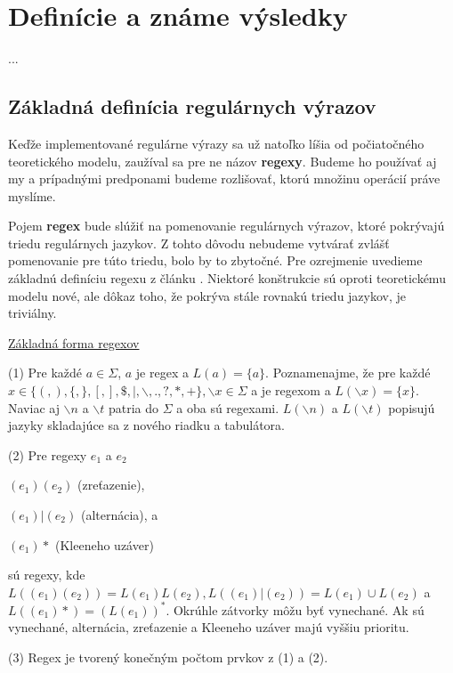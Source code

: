 \chapter{Definície a známe výsledky}
\label{chap:kapitola1}
...

\section{Základná definícia regulárnych výrazov}
\label{def}

Keďže implementované regulárne výrazy sa už natoľko líšia od počiatočného teoretického modelu, zaužíval sa pre ne názov \textbf{regexy}. Budeme ho používať aj my a prípadnými predponami budeme rozlišovať, ktorú množinu operácií práve myslíme.

Pojem \textbf{regex} bude slúžiť na pomenovanie regulárnych výrazov, ktoré pokrývajú triedu regulárnych jazykov. Z tohto dôvodu nebudeme vytvárať zvlášť pomenovanie pre túto triedu, bolo by to zbytočné. Pre ozrejmenie uvedieme základnú definíciu regexu z článku \cite{ExtendedRegexPower}. Niektoré konštrukcie sú oproti teoretickému modelu nové, ale dôkaz toho, že pokrýva stále rovnakú triedu jazykov, je triviálny.

\underline{Základná forma regexov}
\begin{list}{}{}
\item[(1)] Pre každé $a \in \Sigma$, $a$ je regex a $L(a)=\lbrace a \rbrace$. Poznamenajme, že pre každé $x \in \lbrace (,), \{, \},[,],\mathdollar,|, \backslash, .,?,*,+ \rbrace, \backslash x \in \Sigma $ a je regexom a $L(\backslash x) = \lbrace x \rbrace$. Naviac aj $\backslash n$ a $\backslash t$ patria do $\Sigma$ a oba sú regexami. $L(\backslash n)$ a $L(\backslash t)$ popisujú jazyky skladajúce sa z nového riadku a tabulátora.
\item[(2)] Pre regexy $e_1$ a $e_2$ 
\begin{list}{}{}
\item $(e_1)(e_2)$ (zreťazenie), 
\item $(e_1)|(e_2)$ (alternácia), a 
\item $(e_1)*$ (Kleeneho uzáver) 
\end{list}
sú regexy, kde $L((e_1)(e_2)) = L(e_1)L(e_2), L((e_1)|(e_2))=L(e_1) \cup L(e_2)$ a $L((e_1)*) = (L(e_1))^*$. Okrúhle zátvorky môžu byť vynechané. Ak sú vynechané, alternácia, zreťazenie a Kleeneho uzáver majú vyššiu prioritu.
\item[(3)] Regex je tvorený konečným počtom prvkov z (1) a (2).
\end{list}


